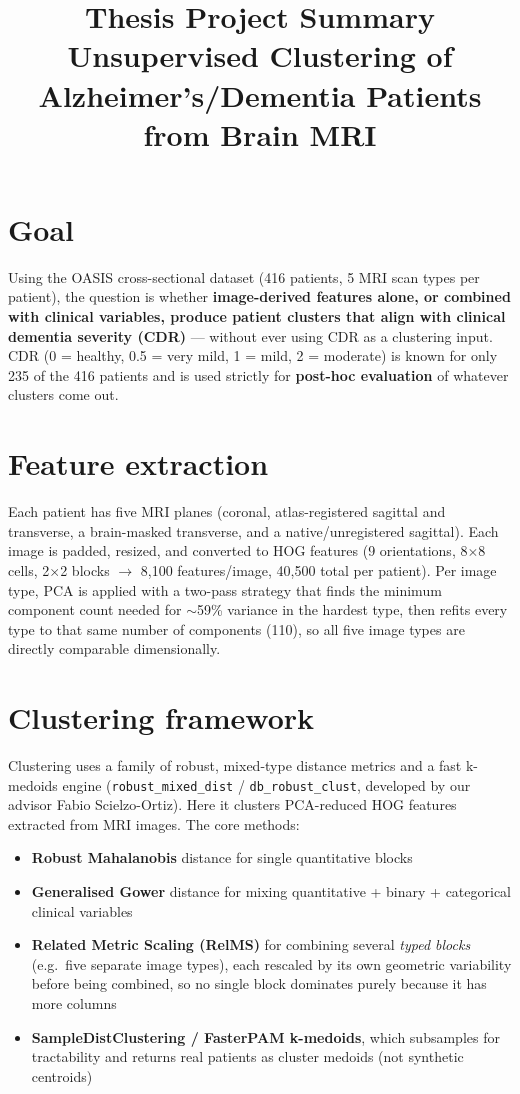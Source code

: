 \documentclass[11pt]{article}
\title{\vspace{-1.5cm}\textbf{Thesis Project Summary}\\[4pt]
\large Unsupervised Clustering of Alzheimer's/Dementia Patients from Brain MRI}
\author{}
\date{}
\newcommand{\code}[1]{\texttt{#1}}
\begin{document}
\maketitle
\vspace{-2.2cm}

\section*{Goal}
Using the OASIS cross-sectional dataset (416 patients, 5 MRI scan types per patient), the
question is whether \textbf{image-derived features alone, or combined with clinical variables,
produce patient clusters that align with clinical dementia severity (CDR)} --- without ever using
CDR as a clustering input. CDR (0 = healthy, 0.5 = very mild, 1 = mild, 2 = moderate) is known for
only 235 of the 416 patients and is used strictly for \textbf{post-hoc evaluation} of whatever
clusters come out.

\section*{Feature extraction}
Each patient has five MRI planes (coronal, atlas-registered sagittal and transverse, a
brain-masked transverse, and a native/unregistered sagittal). Each image is padded, resized, and
converted to HOG features (9 orientations, 8$\times$8 cells, 2$\times$2 blocks $\rightarrow$ 8{,}100
features/image, 40{,}500 total per patient). Per image type, PCA is applied with a two-pass
strategy that finds the minimum component count needed for $\sim$59\% variance in the hardest
type, then refits every type to that same number of components (110), so all five image types are
directly comparable dimensionally.

\section*{Clustering framework}
Clustering uses a family of robust, mixed-type distance metrics and a fast k-medoids engine
(\code{robust\_mixed\_dist} / \code{db\_robust\_clust}, developed by our advisor Fabio
Scielzo-Ortiz). Here it clusters PCA-reduced HOG features extracted from MRI images. The core methods:
\begin{itemize}[leftmargin=1.4em]
  \item \textbf{Robust Mahalanobis} distance for single quantitative blocks
  \item \textbf{Generalised Gower} distance for mixing quantitative + binary + categorical clinical variables
  \item \textbf{Related Metric Scaling (RelMS)} for combining several \emph{typed blocks} (e.g.\ five
  separate image types), each rescaled by its own geometric variability before being combined, so
  no single block dominates purely because it has more columns
  \item \textbf{SampleDistClustering / FasterPAM k-medoids}, which subsamples for tractability and
  returns real patients as cluster medoids (not synthetic centroids)
\end{itemize}
\end{document}
